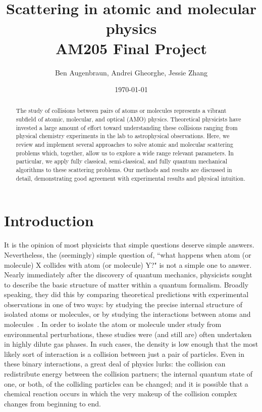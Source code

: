 \documentclass[%
 reprint,
 amsmath,amssymb,
 aps,
 nofootinbib
]{revtex4-1}
\begin{document}

\title{Scattering in atomic and molecular physics \\ AM205 Final Project}%

\author{Ben Augenbraun, Andrei Gheorghe, Jessie Zhang}

\date{\today}%

\begin{abstract}
The study of collisions between pairs of atoms or molecules represents a vibrant subfield of atomic, molecular, and optical (AMO) physics. Theoretical physicists have invested a large amount of effort toward understanding these collisions ranging from physical chemistry experiments in the lab to astrophysical observations. Here, we review and implement several approaches to solve atomic and molecular scattering problems which, together, allow us to explore a wide range relevant parameters. In particular, we apply fully classical, semi-classical, and fully quantum mechanical algorithms to these scattering problems. Our methods and results are discussed in detail, demonstrating good agreement with experimental results and physical intuition.
\end{abstract}

\maketitle

\section{\label{sec:Introduction}Introduction}
It is the opinion of most physicists that simple questions deserve simple answers. Nevertheless, the (seemingly) simple question of, ``what happens when atom (or molecule) X collides with atom (or molecule) Y?" is not a simple one to answer. Nearly immediately after the discovery of quantum mechanics, physicists sought to describe the basic structure of matter within a quantum formalism. Broadly speaking, they did this by comparing theoretical predictions with experimental observations in one of two ways: by studying the precise internal structure of isolated atoms or molecules, or by studying the interactions between atoms and molecules~\cite{SchrodPaper1926,DiracTextbook,QuantumScatteringTextbook}. In order to isolate the atom or molecule under study from environmental perturbations, these studies were (and still are) often undertaken in highly dilute gas phases. In such cases, the density is low enough that the most likely sort of interaction is a collision between just a pair of particles. Even in these binary interactions, a great deal of physics lurks: the collision can redistribute energy between the collision partners; the internal quantum state of one, or both, of the colliding particles can be changed; and it is possible that a chemical reaction occurs in which the very makeup of the collision complex changes from beginning to end.
\end{document}
